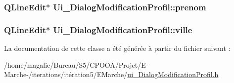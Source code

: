 \hypertarget{class_ui___dialog_modification_profil_a34af0438ab4d51c5a1cbd3171ca56fbf}{
\subsubsection[{prenom}]{\setlength{\rightskip}{0pt plus 5cm}Q\-Line\-Edit$\ast$ Ui\-\_\-\-Dialog\-Modification\-Profil\-::prenom}}\label{class_ui___dialog_modification_profil_a34af0438ab4d51c5a1cbd3171ca56fbf}
\hypertarget{class_ui___dialog_modification_profil_a1c6d48ece9604745e80462ef426ac0ea}{
\subsubsection[{ville}]{\setlength{\rightskip}{0pt plus 5cm}Q\-Line\-Edit$\ast$ Ui\-\_\-\-Dialog\-Modification\-Profil\-::ville}}\label{class_ui___dialog_modification_profil_a1c6d48ece9604745e80462ef426ac0ea}


La documentation de cette classe a été générée à partir du fichier suivant \-:\begin{DoxyCompactItemize}
\item 
/home/magalie/\-Bureau/\-S5/\-C\-P\-O\-O\-A/\-Projet/\-E-\/\-Marche-\//iterations/itération5/\-E\-Marche/\hyperlink{ui___dialog_modification_profil_8h}{ui\-\_\-\-Dialog\-Modification\-Profil.\-h}\end{DoxyCompactItemize}
